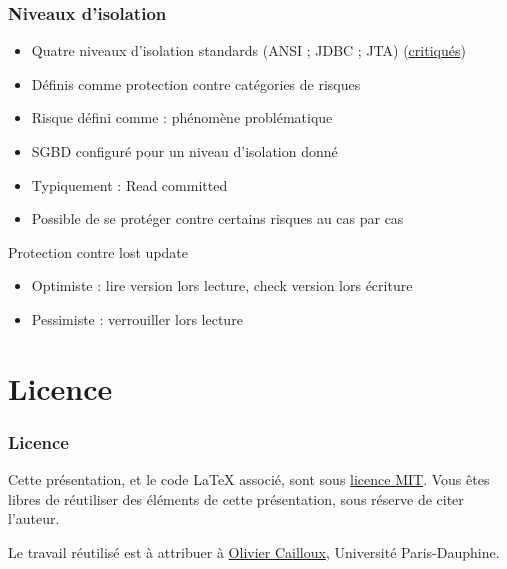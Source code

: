 \documentclass[english, french]{beamer}
\begin{document}
\begin{frame}
	\frametitle{Niveaux d’isolation}
	\begin{itemize}
		\item Quatre niveaux d’isolation standards (ANSI ; JDBC ; JTA) {\tiny (\href{https://doi.org/10.1145/223784.223785}{critiqués})}
		\item Définis comme protection contre catégories de risques
		\item Risque défini comme : phénomène problématique
		\item SGBD configuré pour un niveau d’isolation donné
		\item Typiquement : Read committed
		\item Possible de se protéger contre certains risques au cas par cas
	\end{itemize}
	\begin{block}{Protection contre  lost update}
		\begin{itemize}
			\item Optimiste : lire version lors lecture, check version lors écriture
			\item Pessimiste : verrouiller lors lecture
		\end{itemize}
	\end{block}
\end{frame}

\appendix
\section{Licence}
\begin{frame}
	\frametitle{Licence}
	Cette présentation, et le code LaTeX associé, sont sous \href{https://opensource.org/licenses/MIT}{licence MIT}. Vous êtes libres de réutiliser des éléments de cette présentation, sous réserve de citer l’auteur.
	
	Le travail réutilisé est à attribuer à \href{http://www.lamsade.dauphine.fr/~ocailloux/}{Olivier Cailloux}, Université Paris-Dauphine.
\end{frame}
\end{document}
